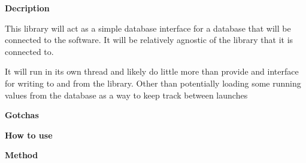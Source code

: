 {\bfseries{Decription}}

This library will act as a simple database interface for a database that will be connected to the software. It will be relatively agnostic of the library that it is connected to.

It will run in its own thread and likely do little more than provide and interface for writing to and from the library. Other than potentially loading some running values from the database as a way to keep track between launches

{\bfseries{Gotchas}}

{\bfseries{How to use}}

{\bfseries{Method}} 